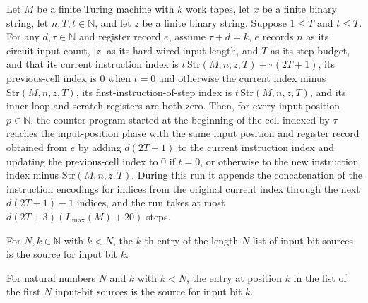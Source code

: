 \begin{theorem}
\label{Complexity.UTab.goes_tapes}
\leanok
{}
Let $M$ be a finite Turing machine with $k$ work tapes, let $x$ be a finite binary
string, let $n,T,t\in\mathbb N$, and let $z$ be a finite binary string. Suppose $1\le T$
and $t\le T$. For any $d,\tau\in\mathbb N$ and register record $e$, assume $\tau+d=k$,
$e$ records $n$ as its circuit-input count, $|z|$ as its hard-wired input length, and
$T$ as its step budget, and that its current instruction index is
$t\,\mathrm{Str}(M,n,z,T)+\tau(2T+1)$, its previous-cell index is $0$ when $t=0$ and
otherwise the current index minus $\mathrm{Str}(M,n,z,T)$, its first-instruction-of-step
index is $t\,\mathrm{Str}(M,n,z,T)$, and its inner-loop and scratch registers are both
zero. Then, for every input position $p\in\mathbb N$, the counter program started at the
beginning of the cell indexed by $\tau$ reaches the input-position phase with the same
input position and register record obtained from $e$ by adding $d(2T+1)$ to the current
instruction index and updating the previous-cell index to $0$ if $t=0$, or otherwise to
the new instruction index minus $\mathrm{Str}(M,n,z,T)$. During this run it appends the
concatenation of the instruction encodings for indices from the original current index
through the next $d(2T+1)-1$ indices, and the run takes at most
$d(2T+3)(L_{\max}(M)+20)$ steps.
\end{theorem}

\begin{theorem}
\label{Complexity.UTab.tabLayout_getD}
\leanok
{}
For $N,k\in\mathbb{N}$ with $k<N$, the $k$-th entry of the length-$N$ list of input-bit
sources is the source for input bit $k$.
\end{theorem}

\begin{theorem}
\leanok
{}
For natural numbers $N$ and $k$ with $k<N$, the entry at position $k$ in the list of the
first $N$ input-bit sources is the source for input bit $k$.
\end{theorem}

